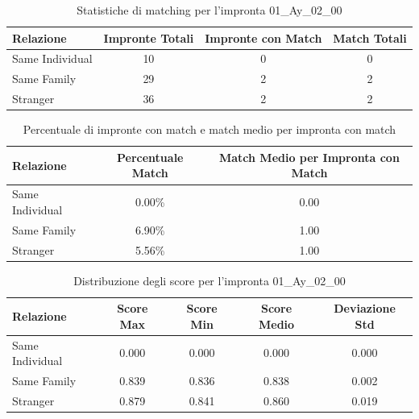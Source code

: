 \begin{table}[htbp]
\centering
\caption{Statistiche di matching per l'impronta 01\_Ay\_02\_00}
\label{tab:results_01_Ay_02_00}
\begin{tabular}{|l|c|c|c|}
\hline
\textbf{Relazione} & \textbf{Impronte Totali} & \textbf{Impronte con Match} & \textbf{Match Totali} \\
\hline
Same Individual & 10 & 0 & 0 \\
\hline
Same Family & 29 & 2 & 2 \\
\hline
Stranger & 36 & 2 & 2 \\
\hline
\end{tabular}
\end{table}


\begin{table}[htbp]
\centering
\caption{Percentuale di impronte con match e match medio per impronta con match}
\label{tab:match_percentage_01_Ay_02_00}
\begin{tabular}{|l|c|c|}
\hline
\textbf{Relazione} & \textbf{Percentuale Match} & \textbf{Match Medio per Impronta con Match} \\
\hline
Same Individual & 0.00\% & 0.00 \\
\hline
Same Family & 6.90\% & 1.00 \\
\hline
Stranger & 5.56\% & 1.00 \\
\hline
\end{tabular}
\end{table}


\begin{table}[htbp]
\centering
\caption{Distribuzione degli score per l'impronta 01\_Ay\_02\_00}
\label{tab:scores_01_Ay_02_00}
\begin{tabular}{|l|c|c|c|c|}
\hline
\textbf{Relazione} & \textbf{Score Max} & \textbf{Score Min} & \textbf{Score Medio} & \textbf{Deviazione Std} \\
\hline
Same Individual & 0.000 & 0.000 & 0.000 & 0.000 \\
\hline
Same Family & 0.839 & 0.836 & 0.838 & 0.002 \\
\hline
Stranger & 0.879 & 0.841 & 0.860 & 0.019 \\
\hline
\end{tabular}
\end{table}

